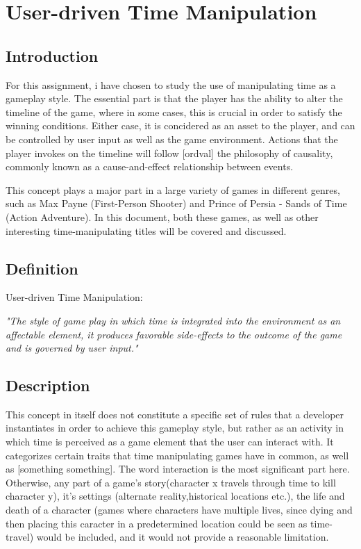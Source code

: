 \chapter{User-driven Time Manipulation}

\section{Introduction}

For this assignment, i have chosen to study the use of manipulating time as a gameplay style. The essential part is that the player has the ability to alter the timeline of the game, where in some cases, this is crucial in order to satisfy the winning conditions. Either case, it is concidered as an asset to the player, and can be controlled by user input as well as the game environment. Actions that the player invokes on the timeline will follow [ordval] the philosophy of causality, commonly known as a cause-and-effect relationship between events. 

This concept plays a major part in a large variety of games in different genres, such as Max Payne (First-Person Shooter) and Prince of Persia - Sands of Time (Action Adventure). In this document, both these games, as well as other interesting time-manipulating titles will be covered and discussed. 

\section{Definition}

User-driven Time Manipulation:

\emph{"The style of game play in which time is integrated into the environment as an affectable element, it produces favorable side-effects to the outcome of the game and is governed by user input." }

\section{Description}

This concept in itself does not constitute a specific set of rules that a developer instantiates in order to achieve this gameplay style, 
but rather as an activity in which time is perceived as a game element that the user can interact with. It categorizes certain traits that time manipulating games have in common, as well as [something something]. 
The word interaction is the most significant part here. Otherwise, any part of a game's story(character x travels 
through time to kill character y), it's settings (alternate reality,historical locations etc.), the life and death of a 
character (games where characters have multiple lives, since dying and then placing this caracter in a predetermined 
location could be seen as time-travel) would be included, and it would not provide a reasonable limitation. 

